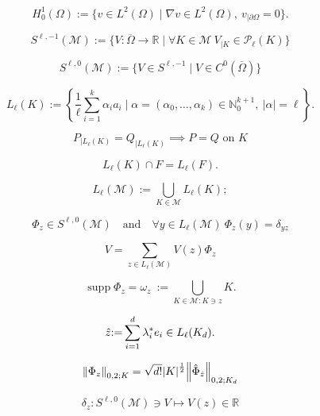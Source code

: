 \documentclass[a4paper]{article}
\begin{document}
\begin{equation}
\label{D:H10}
 H^1_0(\Omega)
 {:=}
 \{v\in{L^{{2}}}(\Omega) \mid
  {\nabla} v\in{L^{{2}}}(\Omega),\ 
  v_{|\partial\Omega} = 0 \}.
\end{equation}

\[
 {S}^{{\ell},{-1}}({\mathcal{M}})
 {:=}
 \{ V:\overline\Omega\to{\mathbb{R}} \mid
   \forall{K}\in{\mathcal{M}}\ V_{|{K}}\in{\mathcal{P}_{{\ell}}({{K}})} \}
\]

\[
 {S}^{{\ell},0}({\mathcal{M}})
 {:=}
 \{ V\in{S}^{{\ell},{-1}} \mid
   V\in C^0(\overline\Omega) \}
\]

\[
 {L_{{\ell}}}({K})
 {:=}
 \left\{
  \frac1{\ell} \sum_{i=1}^k \alpha_i a_i \mid
   \alpha=(\alpha_0,\dots,\alpha_k)\in{\mathbb{N}}_0^{k+1}, \
   {|{{\alpha}}|}={\ell}
  \right\}.
\]

\[
 P_{|{L_{{\ell}}}({K})}=Q_{|{L_{{\ell}}}({K})}
\implies
 P=Q \text{ on }{K}
\]

\begin{equation}
\label{LagrangeCompatability}
 {L_{{\ell}}}({K})\cap{F}={L_{{\ell}}}({F}).
\end{equation}

\[
 {L_{{\ell}}}({\mathcal{M}})
 {:=}
 \bigcup_{{K}\in{\mathcal{M}}} {L_{{\ell}}}({K});
\]

\begin{equation}
\label{LgrBasis}
 {\Phi}_z\in{S}^{{\ell},0}({\mathcal{M}})
\quad\text{and}\quad
 \forall y\in{L_{{\ell}}}({\mathcal{M}})\ 
 {\Phi}_z(y) = \delta_{yz}
\end{equation}

\begin{equation*}
  V = \sum_{z\in{L_{{\ell}}}({\mathcal{M}})} V(z) {\Phi}_z
\end{equation*}

\[
 \operatorname{supp}{\Phi}_z
 =
 \omega_z\
 {:=}
 \bigcup_{{K}\in{\mathcal{M}}:{K}\ni z} {K}.
\]

\begin{equation}
\label{RefNode}
 \Hat{z}{:=}\sum_{i=1}^d \lambda_i^* e_i
 \in
 {L_{{\ell}}}({{{K}_d}}).
\end{equation}

\begin{equation}
\label{LebnormBFct2}
 {{\left\|{{{\Phi}_z}}\right\|_{{0,2;{K}}}}}
 =
 \sqrt{d!}{\left|{K}\right|}^{\frac12} {{\left\|{{\Hat{\Phi}_{\Hat z}}}\right\|_{{0,2;{{{K}_d}}}}}}
\end{equation}

\begin{equation}
\label{PointEVal}
 \delta_z : 
 {S}^{{\ell},0}({\mathcal{M}}) \ni V
 \mapsto
 V(z) \in {\mathbb{R}}
\end{equation}
\end{document}
